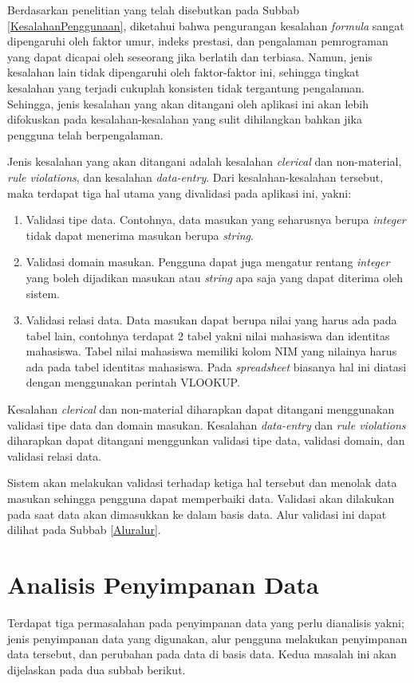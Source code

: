 Berdasarkan penelitian yang telah disebutkan pada Subbab \ref{KesalahanPenggunaan}, diketahui bahwa pengurangan kesalahan \textit{formula} sangat dipengaruhi oleh faktor umur, indeks prestasi, dan pengalaman pemrograman yang dapat dicapai oleh seseorang jika berlatih dan terbiasa. Namun, jenis kesalahan lain tidak dipengaruhi oleh faktor-faktor ini, sehingga tingkat kesalahan yang terjadi cukuplah konsisten tidak tergantung pengalaman. Sehingga, jenis kesalahan yang akan ditangani oleh aplikasi ini akan lebih difokuskan pada kesalahan-kesalahan yang sulit dihilangkan bahkan jika pengguna telah berpengalaman.

Jenis kesalahan yang akan ditangani adalah kesalahan \textit{clerical} dan non-material, \textit{rule violations}, dan kesalahan \textit{data-entry}. Dari kesalahan-kesalahan tersebut, maka terdapat tiga hal utama yang divalidasi pada aplikasi ini, yakni:
\begin{enumerate}
	\item Validasi tipe data. Contohnya, data masukan yang seharusnya berupa \textit{integer} tidak dapat menerima masukan berupa \textit{string}.
	\item Validasi domain masukan. Pengguna dapat juga mengatur rentang \textit{integer} yang boleh dijadikan masukan atau \textit{string} apa saja yang dapat diterima oleh sistem.
	\item Validasi relasi data. Data masukan dapat berupa nilai yang harus ada pada tabel lain, contohnya terdapat 2 tabel yakni nilai mahasiswa dan identitas mahasiswa. Tabel nilai mahasiswa memiliki kolom NIM yang nilainya harus ada pada tabel identitas mahasiswa. Pada \textit{spreadsheet} biasanya hal ini diatasi dengan menggunakan perintah VLOOKUP.
\end{enumerate}

Kesalahan \textit{clerical} dan non-material diharapkan dapat ditangani menggunakan validasi tipe data dan domain masukan. Kesalahan \textit{data-entry} dan \textit{rule violations} diharapkan dapat ditangani menggunkan validasi tipe data, validasi domain, dan validasi relasi data.

Sistem akan melakukan validasi terhadap ketiga hal tersebut dan menolak data masukan sehingga pengguna dapat memperbaiki data. Validasi akan dilakukan pada saat data akan dimasukkan ke dalam basis data. Alur validasi ini dapat dilihat pada Subbab \ref{Aluralur}.

\section{Analisis Penyimpanan Data}
Terdapat tiga permasalahan pada penyimpanan data yang perlu dianalisis yakni; jenis penyimpanan data yang digunakan, alur pengguna melakukan penyimpanan data tersebut, dan perubahan pada data di basis data. Kedua masalah ini akan dijelaskan pada dua subbab berikut.

